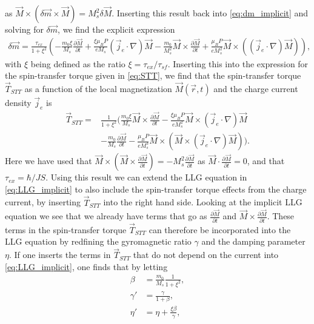 \documentclass[12pt, a4paper]{article}		%
\numberwithin{equation}{section}
\begin{document}
as $\vec{M} \times (\delta\vec{m}\times\vec{M}) = M_s^2\delta\vec{M}$. Inserting this result back into \eqref{eq:dm_implicit} and solving for $\delta\vec{m}$, we find the explicit expression
\begin{align}
\label{eq:dm_explicit}
\delta\vec{m} = \frac{\tau_{ex}}{1+\xi^2}(-\frac{m_0\xi}{M_s}\frac{\partial \vec{M}}{\partial t} + \frac{\xi \mu_B P}{e M_s}(\vec{j}_e\cdot\nabla)\vec{M} - \frac{m_0}{M_s^2}\vec{M}\times \frac{\partial \vec{M}}{\partial t} + \frac{\mu_B P}{e M_s^2}\vec{M}\times((\vec{j}_e\cdot\nabla)\vec{M})),
\end{align}
with $\xi$ being defined as the ratio $\xi = \tau_{ex}/\tau_{sf}$. Inserting this into the expression for the spin-transfer torque given in \eqref{eq:STT}, we find that the spin-transfer torque $\vec{T}_{STT}$ as a function of the local magnetization $\vec{M}(\vec{r}, t)$ and the charge current density $\vec{j}_e$ is 
\begin{align}
\nonumber\vec{T}_{STT} = &\frac{1}{1+\xi^2} (\frac{m_0\xi}{M_s}\vec{M}\times\frac{\partial \vec{M}}{\partial t} - \frac{\xi\mu_B P}{e M_s^2}\vec{M}\times(\vec{j}_e\cdot\nabla)\vec{M} \\
&- \frac{m_0}{M_s} \frac{\partial \vec{M}}{\partial t} - \frac{\mu_B P}{e M_s^3} \vec{M}\times (\vec{M}\times(\vec{j}_e\cdot\nabla)\vec{M})).\label{eq:STT_final}
\end{align}
Here we have used that $\vec{M}\times(\vec{M}\times\frac{\partial \vec{M}}{\partial t}) = -M_s^2\frac{\partial \vec{M}}{\partial t}$ as $\vec{M}\cdot\frac{\partial \vec{M}}{\partial t} = 0$, and that $\tau_{ex} = \hbar/JS$. Using this result we can extend the LLG equation in \eqref{eq:LLG_implicit} to also include the spin-transfer torque effects from the charge current, by inserting $\vec{T}_{STT}$ into the right hand side. Looking at the implicit LLG equation we see that we already have terms that go as $\frac{\partial \vec{M}}{\partial t}$ and $\vec{M}\times\frac{\partial \vec{M}}{\partial t}$. These terms in the spin-transfer torque $\vec{T}_{STT}$ can therefore be incorporated into the LLG equation by redfining the gyromagnetic ratio $\gamma$ and the damping parameter $\eta$. If one inserts the terms in $\vec{T}_{STT}$ that do not depend on the current into \eqref{eq:LLG_implicit}, one finds that by letting
\begin{align}
\beta &= \frac{m_0}{M_s}\frac{1}{1+\xi^2}, \\
\gamma ' &= \frac{\gamma}{1+\beta}, \\
\eta ' &= \eta + \frac{\xi\beta}{\gamma},
\end{align}
\end{document}
